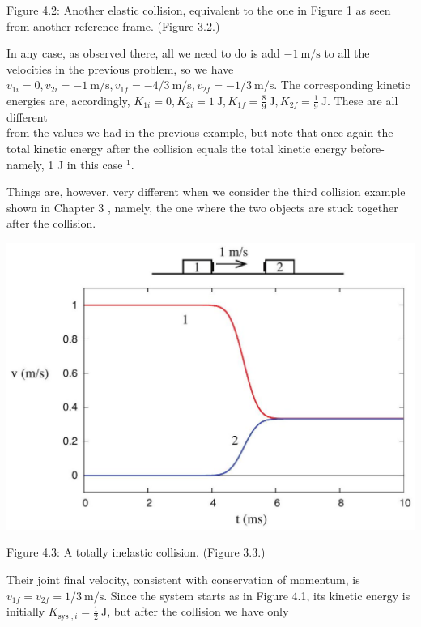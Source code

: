 \documentclass[10pt]{article}
\begin{document}
Figure 4.2: Another elastic collision, equivalent to the one in Figure 1 as seen from another reference frame. (Figure 3.2.)

In any case, as observed there, all we need to do is add $-1 \mathrm{~m} / \mathrm{s}$ to all the velocities in the previous problem, so we have $v_{1 i}=0, v_{2 i}=-1 \mathrm{~m} / \mathrm{s}, v_{1 f}=-4 / 3 \mathrm{~m} / \mathrm{s}, v_{2 f}=-1 / 3 \mathrm{~m} / \mathrm{s}$. The corresponding kinetic energies are, accordingly, $K_{1 i}=0, K_{2 i}=1 \mathrm{~J}, K_{1 f}=\frac{8}{9} \mathrm{~J}, K_{2 f}=\frac{1}{9} \mathrm{~J}$. These are all different\\
from the values we had in the previous example, but note that once again the total kinetic energy after the collision equals the total kinetic energy before-namely, 1 J in this case ${ }^{1}$.

Things are, however, very different when we consider the third collision example shown in Chapter 3 , namely, the one where the two objects are stuck together after the collision.

\begin{center}
\includegraphics[max width=\textwidth]{2024_09_14_9969b06773f10b6936e8g-090}
\end{center}

Figure 4.3: A totally inelastic collision. (Figure 3.3.)

Their joint final velocity, consistent with conservation of momentum, is $v_{1 f}=v_{2 f}=1 / 3 \mathrm{~m} / \mathrm{s}$. Since the system starts as in Figure 4.1, its kinetic energy is initially $K_{\text {sys }, i}=\frac{1}{2} \mathrm{~J}$, but after the collision we have only
\end{document}
